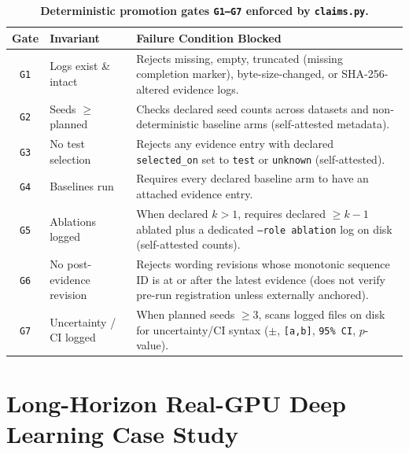 \begin{table}[h]
\centering
\caption{\textbf{Deterministic promotion gates \texttt{G1--G7} enforced by \texttt{claims.py}.}}
\label{tab:gates}
\setlength{\tabcolsep}{5pt}
\footnotesize
\begin{tabularx}{\textwidth}{clX}
\toprule
\textbf{Gate} & \textbf{Invariant} & \textbf{Failure Condition Blocked} \\
\midrule
\texttt{G1} & Logs exist \& intact & Rejects missing, empty, truncated (missing completion marker), byte-size-changed, or SHA-256-altered evidence logs. \\
\texttt{G2} & Seeds $\ge$ planned & Checks declared seed counts across datasets and non-deterministic baseline arms (self-attested metadata). \\
\texttt{G3} & No test selection & Rejects any evidence entry with declared \texttt{selected\_on} set to \texttt{test} or \texttt{unknown} (self-attested). \\
\texttt{G4} & Baselines run & Requires every declared baseline arm to have an attached evidence entry. \\
\texttt{G5} & Ablations logged & When declared $k>1$, requires declared $\ge k-1$ ablated plus a dedicated \texttt{--role ablation} log on disk (self-attested counts). \\
\texttt{G6} & No post-evidence revision & Rejects wording revisions whose monotonic sequence ID is at or after the latest evidence (does not verify pre-run registration unless externally anchored). \\
\texttt{G7} & Uncertainty / CI logged & When planned seeds $\ge 3$, scans logged files on disk for uncertainty/CI syntax (\texttt{$\pm$}, \texttt{[a,b]}, \texttt{95\% CI}, $p$-value). \\
\bottomrule
\end{tabularx}
\end{table}

\section{Long-Horizon Real-GPU Deep Learning Case Study}
\label{app:gpu_case_study}

